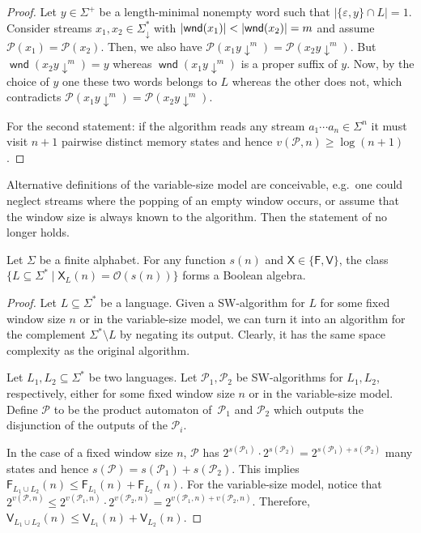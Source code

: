 \documentclass{theoretics}
\renewcommand{\O}{\mathcal{O}}
\renewcommand{\P}{\mathcal{P}}
\newcommand{\F}{\mathsf{F}}
\newcommand{\V}{\mathsf{V}}
\newcommand{\X}{\mathsf{X}}
\DeclareMathOperator{\wnd}{\mathsf{wnd}}
\newcommand{\eps}{\varepsilon}
\DeclarePairedDelimiter{\abs}{\lvert}{\rvert}
\renewcommand{\geq}{\geqslant}
\renewcommand{\leq}{\leqslant}
\renewcommand{\ge}{\geq}
\renewcommand{\le}{\leq}
\begin{document}
\begin{proof}
	Let $y \in \Sigma^+$ be a length-minimal nonempty word such that $|\{\eps,y\} \cap L| = 1$.
	Consider streams $x_1, x_2 \in \Sigma_\downarrow^*$ with $\abs{\wnd(x_1)} < \abs{\wnd(x_2)} = m$ and assume $\P(x_1) = \P(x_2)$.
	Then, we also have $\P(x_1 y \!\! \downarrow^m) = \P(x_2 y\!\!\downarrow^m)$.
	But $\wnd(x_2 y \!\! \downarrow^m) = y$ whereas $\wnd(x_1 y \!\!  \downarrow^m)$ is a proper suffix of $y$.
	Now, by the choice of $y$ one these two words belongs to $L$ whereas the other does not, which contradicts
	$\P(x_1 y \!\!  \downarrow^m) = \P(x_2 y \!\! \downarrow^m)$.
	
	For the second statement: if the algorithm reads any stream $a_1 \cdots a_n \in \Sigma^n$
	it must visit $n+1$ pairwise distinct
	memory states and hence $v(\P,n) \ge \log (n+1)$.
\end{proof}

Alternative definitions of the variable-size model are conceivable,
e.g.~one could neglect streams where the popping of an empty window occurs,
or assume that the window size is always known to the algorithm. Then the statement of 
 no longer holds.

\begin{lemma}
	\label{lem:boolean}
	Let $\Sigma$ be a finite alphabet.
	For any function $s(n)$ and $\X \in \{\F,\V\}$, the class
	$\{ L \subseteq \Sigma^* \mid \X_L(n) = \O(s(n)) \}$
	forms a Boolean algebra.
\end{lemma}

\begin{proof}
	Let $L \subseteq \Sigma^*$ be a language.
	Given a SW-algorithm for $L$ for some fixed window size $n$
	or in the variable-size model,
	we can turn it into an algorithm for the complement $\Sigma^* \setminus L$
	by negating its output.
	Clearly, it has the same space complexity as the original algorithm.
	
	Let $L_1,L_2 \subseteq \Sigma^*$ be two languages.
	Let $\P_1,\P_2$ be SW-algorithms for $L_1,L_2$, respectively, either
	for some fixed window size $n$ or in the variable-size model.
	Define $\P$ to be the product automaton of~$\P_1$ and $\P_2$
	which outputs the disjunction of the outputs of the $\P_i$.
	
	In the case of a fixed window size $n$, $\P$ has 
	$2^{s(\P_1)} \cdot 2^{s(\P_2)} = 2^{s(\P_1)+s(\P_2)}$ many states
	and hence $s(\P) = s(\P_1) + s(\P_2)$.
	This implies $\F_{L_1 \cup L_2}(n) \le \F_{L_1}(n) + \F_{L_2}(n)$.
	For the variable-size model, notice that
	$2^{v(\P,n)} \le 2^{v(\P_1,n)} \cdot 2^{v(\P_2,n)} = 2^{v(\P_1,n) + v(\P_2,n)}$.
	Therefore, $\V_{L_1 \cup L_2}(n) \le \V_{L_1}(n) + \V_{L_2}(n)$.
\end{proof}
\end{document}
